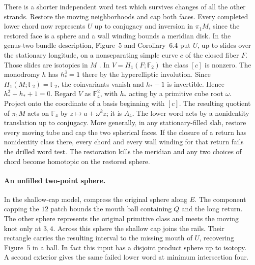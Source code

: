 \documentclass[11pt,letterpaper]{article}
\numberwithin{equation}{section}
\theoremstyle{remark}
\begin{document}
There is a shorter independent word test which survives changes of
all the other strands. Restore the moving neighborhoods and cap both
faces. Every completed lower chord now represents \(U\) up to
conjugacy and inversion in \(\pi_1M\), since the restored face is a
sphere and a wall winding bounds a meridian disk. In the genus-two
bundle description, Figure~5 and Corollary~6.4 put \(U\), up to
slides over the stationary longitude, on a nonseparating simple
curve \(c\) of the closed fiber \(F\). Those slides are isotopies in
\(M\) \cite[Lemma 6.2 and Corollary 6.4]{GompfScharlemannThompson2010}.
In \(V=H_1(F;\mathbb F_2)\) the class \([c]\) is nonzero.
The monodromy \(h\) has \(h_*^3=1\) there by the hyperelliptic
involution. Since \(H_1(M;\mathbb F_2)=\mathbb F_2\), the
coinvariants vanish and \(h_*-1\) is invertible. Hence
\(h_*^2+h_*+1=0\). Regard \(V\) as \(\mathbb F_4^2\), with
\(h_*\) acting by a primitive cube root \(\omega\).
Project onto the coordinate of a basis beginning with \([c]\).
The resulting quotient of \(\pi_1 M\) acts on \(\mathbb F_4\) by
\(z\mapsto a+\omega^k z\); it is \(A_4\).
The lower word acts by a nonidentity translation up to conjugacy.
More generally, in any stationary-filled slab, restore every moving
tube and cap the two spherical faces. If the closure of a return has
nonidentity class there, every chord and every wall winding for that
return fails the drilled word test. The restoration kills the meridian
and any two choices of chord become homotopic on the restored sphere.

\paragraph{An unfilled two-point sphere.}
In the shallow-cap model, compress the original sphere along \(E\).
The component capping the \(12\) patch bounds the mouth ball
containing \(Q\) and the long return. The other sphere represents
the original primitive class and meets the moving knot only at
\(3,4\). Across this sphere the shallow cap joins the rails. Their
rectangle carries the resulting interval to the missing mouth of
\(U\), recovering Figure~5 in a ball. In fact this input has a
disjoint product sphere up to isotopy. A second exterior gives the
same failed lower word at minimum intersection four.
\end{document}
